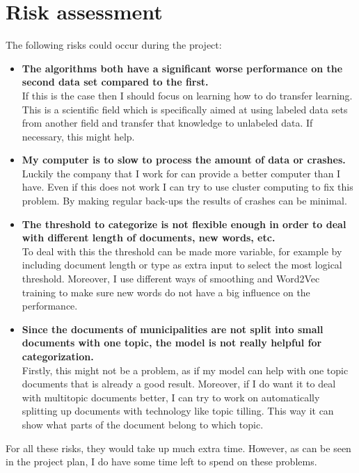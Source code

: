 \documentclass[a4paper]{article}
\begin{document}
\section{Risk assessment}
The following risks could occur during the project:
\begin{itemize}
    \item \textbf{The algorithms both have a significant worse performance on the second data set compared to the first.}\\
If this is the case then I should focus on learning how to do transfer learning. This is a scientific field which is specifically aimed at using labeled data sets from another field and transfer that knowledge to unlabeled data. If necessary, this might help.
    \item \textbf{My computer is to slow to process the amount of data or crashes.}\\
Luckily the company that I work for can provide a better computer than I have. Even if this does not work I can try to use cluster computing to fix this problem. By making regular back-ups the results of crashes can be minimal.
    \item \textbf{The threshold to categorize is not flexible enough in order to deal with different length of documents, new words, etc.}\\
To deal with this the threshold can be made more variable, for example by including document length or type as extra input to select the most logical threshold. Moreover, I use different ways of smoothing and Word2Vec training to make sure new words do not have a big influence on the performance.
    \item \textbf{Since the documents of municipalities are not split into small documents with one topic, the model is not really helpful for categorization.}\\
Firstly, this might not be a problem, as if my model can help with one topic documents that is already a good result. Moreover, if I do want it to deal with multitopic documents better, I can try to work on automatically splitting up documents with technology like topic tilling. This way it can show what parts of the document belong to which topic.
\end{itemize}
For all these risks, they would take up much extra time. However, as can be seen in the project plan, I do have some time left to spend on these problems.
	
\end{document}
